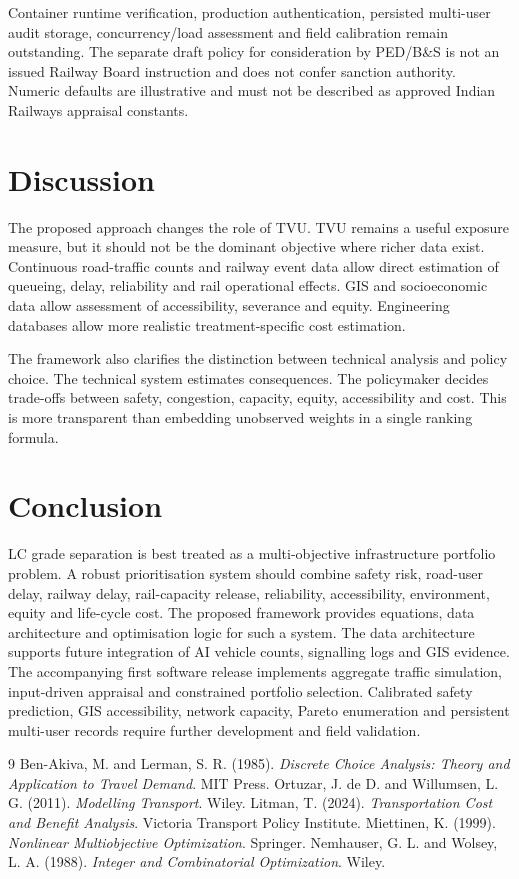 \documentclass[11pt,a4paper]{article}
\begin{document}
Container runtime verification, production authentication, persisted multi-user audit storage, concurrency/load assessment and field calibration remain outstanding. The separate draft policy for consideration by PED/B\&S is not an issued Railway Board instruction and does not confer sanction authority. Numeric defaults are illustrative and must not be described as approved Indian Railways appraisal constants.


\section{Discussion}

The proposed approach changes the role of TVU. TVU remains a useful exposure measure, but it should not be the dominant objective where richer data exist. Continuous road-traffic counts and railway event data allow direct estimation of queueing, delay, reliability and rail operational effects. GIS and socioeconomic data allow assessment of accessibility, severance and equity. Engineering databases allow more realistic treatment-specific cost estimation.

The framework also clarifies the distinction between technical analysis and policy choice. The technical system estimates consequences. The policymaker decides trade-offs between safety, congestion, capacity, equity, accessibility and cost. This is more transparent than embedding unobserved weights in a single ranking formula.

\section{Conclusion}

LC grade separation is best treated as a multi-objective infrastructure portfolio problem. A robust prioritisation system should combine safety risk, road-user delay, railway delay, rail-capacity release, reliability, accessibility, environment, equity and life-cycle cost. The proposed framework provides equations, data architecture and optimisation logic for such a system. The data architecture supports future integration of AI vehicle counts, signalling logs and GIS evidence. The accompanying first software release implements aggregate traffic simulation, input-driven appraisal and constrained portfolio selection. Calibrated safety prediction, GIS accessibility, network capacity, Pareto enumeration and persistent multi-user records require further development and field validation.

\begin{thebibliography}{9}
 Ben-Akiva, M. and Lerman, S. R. (1985). \textit{Discrete Choice Analysis: Theory and Application to Travel Demand}. MIT Press.
 Ortuzar, J. de D. and Willumsen, L. G. (2011). \textit{Modelling Transport}. Wiley.
 Litman, T. (2024). \textit{Transportation Cost and Benefit Analysis}. Victoria Transport Policy Institute.
 Miettinen, K. (1999). \textit{Nonlinear Multiobjective Optimization}. Springer.
 Nemhauser, G. L. and Wolsey, L. A. (1988). \textit{Integer and Combinatorial Optimization}. Wiley.
\end{thebibliography}
\end{document}
